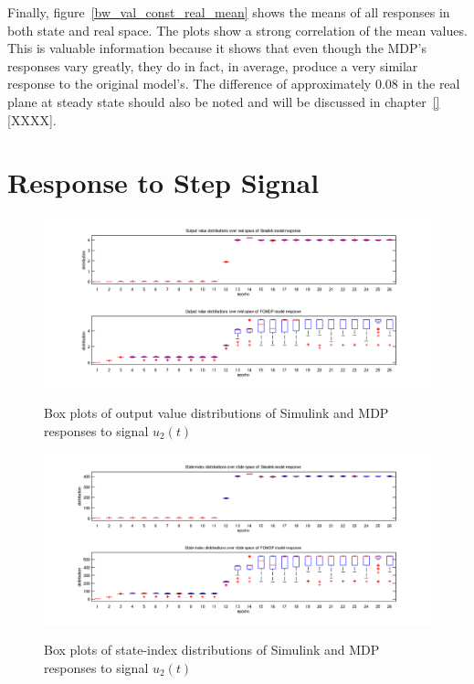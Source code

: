 Finally, figure~\ref{bw_val_const_real_mean} shows the means of all responses in both state and real space. The plots show a strong correlation of the mean values. This is valuable information because it shows that even though the MDP's responses vary greatly, they do in fact, in average, produce a very similar response to the original model's. The difference of approximately 0.08 in the real plane at steady state should also be noted and will be discussed in chapter~\ref{} [XXXX].

\section{Response to Step Signal}
\label{sec:respstep}

\begin{figure}[h!]
\begin{center}
\includegraphics[width=18cm]{media/bw/bw_val_step_real_box}\\
\end{center}
\caption{Box plots of output value distributions of Simulink and MDP responses to signal $u_2(t)$}
\label{bw_val_step_real_box}
\end{figure}

\begin{figure}[h!]
\begin{center}
\includegraphics[width=18cm]{media/bw/bw_val_step_state_box}\\
\end{center}
\caption{Box plots of state-index distributions of Simulink and MDP responses to signal $u_2(t)$}
\label{bw_val_step_state_box}
\end{figure}

